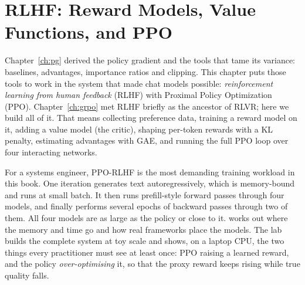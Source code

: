 \chapter{RLHF: Reward Models, Value Functions, and PPO}\label{ch:rlhf}

Chapter~\ref{ch:pg} derived the policy gradient and the tools that tame its variance:
baselines, advantages, importance ratios and clipping. This chapter puts those tools to work in
the system that made chat models possible: \emph{reinforcement learning from human feedback}
(RLHF) with Proximal Policy Optimization (PPO). Chapter~\ref{ch:grpo} met RLHF briefly as the
ancestor of RLVR; here we build all of it. That means collecting preference data, training a reward model
on it, adding a value model (the critic), shaping per-token rewards with a KL penalty,
estimating advantages with GAE, and running the full PPO loop over four interacting networks.

For a systems engineer, PPO-RLHF is the most demanding training workload in this book. One
iteration generates text autoregressively, which is memory-bound and runs at small batch. It then
runs prefill-style forward passes through four models, and finally performs several epochs of
backward passes through two of them. All four models are as large as the policy or close to it.
 works out where the memory and time go and how real frameworks place the
models. The lab builds the complete system at toy scale and shows, on a laptop CPU, the
two things every practitioner must see at least once: PPO raising a learned reward, and the policy
\emph{over-optimising} it, so that the proxy reward keeps rising while true quality falls.

